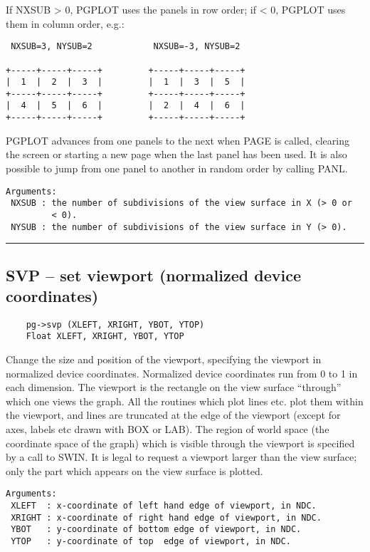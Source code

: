 If NXSUB > 0, PGPLOT uses the panels in row order; if < 0, PGPLOT uses
them in column order, e.g.:

\begin{verbatim}
 NXSUB=3, NYSUB=2            NXSUB=-3, NYSUB=2

+-----+-----+-----+         +-----+-----+-----+
|  1  |  2  |  3  |         |  1  |  3  |  5  |
+-----+-----+-----+         +-----+-----+-----+
|  4  |  5  |  6  |         |  2  |  4  |  6  |
+-----+-----+-----+         +-----+-----+-----+
\end{verbatim}

PGPLOT advances from one panels to the next when PAGE is called,
clearing the screen or starting a new page when the last panel has
been used.  It is also possible to jump from one panel to another in
random order by calling PANL.

\begin{verbatim}
Arguments:
 NXSUB : the number of subdivisions of the view surface in X (> 0 or
         < 0). 
 NYSUB : the number of subdivisions of the view surface in Y (> 0). 
\end{verbatim}

\hrule

\subsection*{SVP -- set viewport (normalized device coordinates) }

\begin{verbatim}
    pg->svp (XLEFT, XRIGHT, YBOT, YTOP)
    Float XLEFT, XRIGHT, YBOT, YTOP
\end{verbatim}

Change the size and position of the viewport, specifying the viewport
in normalized device coordinates.  Normalized device coordinates run
from 0 to 1 in each dimension.  The viewport is the rectangle on the
view surface ``through'' which one views the graph.  All the routines
which plot lines etc. plot them within the viewport, and lines are
truncated at the edge of the viewport (except for axes, labels etc
drawn with BOX or LAB).  The region of world space (the coordinate
space of the graph) which is visible through the viewport is specified
by a call to SWIN.  It is legal to request a viewport larger than the
view surface; only the part which appears on the view surface is
plotted.

\begin{verbatim}
Arguments:
 XLEFT  : x-coordinate of left hand edge of viewport, in NDC. 
 XRIGHT : x-coordinate of right hand edge of viewport, in NDC. 
 YBOT   : y-coordinate of bottom edge of viewport, in NDC.
 YTOP   : y-coordinate of top  edge of viewport, in NDC.
\end{verbatim}

